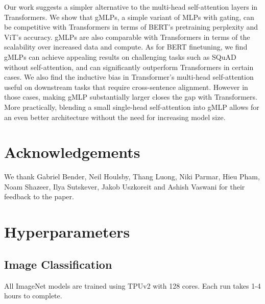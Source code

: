 \documentclass{article}
\newcommand{\gffn}{gMLP\xspace}
\begin{document}
Our work suggests a simpler alternative to the multi-head self-attention layers in Transformers. We show that \gffn{s}, a simple variant of MLPs with gating, can be competitive with Transformers in terms of BERT's pretraining perplexity and ViT's accuracy.
\gffn{s} are also comparable with Transformers in terms of the scalability over increased data and compute.
As for BERT finetuning,
we find \gffn{s} can achieve appealing results on challenging tasks such as SQuAD without self-attention, and can significantly outperform Transformers in certain cases.
We also find the inductive bias in Transformer's multi-head self-attention useful on downstream tasks that require cross-sentence alignment.
However in those cases, making \gffn substantially larger closes the gap with Transformers. More practically, blending a small single-head self-attention into \gffn allows for an even better architecture without the need for increasing model size.


\section*{Acknowledgements}
We thank Gabriel Bender, Neil Houlsby, Thang Luong, Niki Parmar, Hieu Pham, Noam Shazeer, Ilya Sutskever, Jakob Uszkoreit and Ashish Vaswani for their feedback to the paper.





\appendix

\FloatBarrier
\section{Hyperparameters}

\FloatBarrier
\subsection{Image Classification}
\label{sec:vision-hparams}
All ImageNet models are trained using TPUv2 with 128 cores. Each run takes 1-4 hours to complete.
\end{document}
